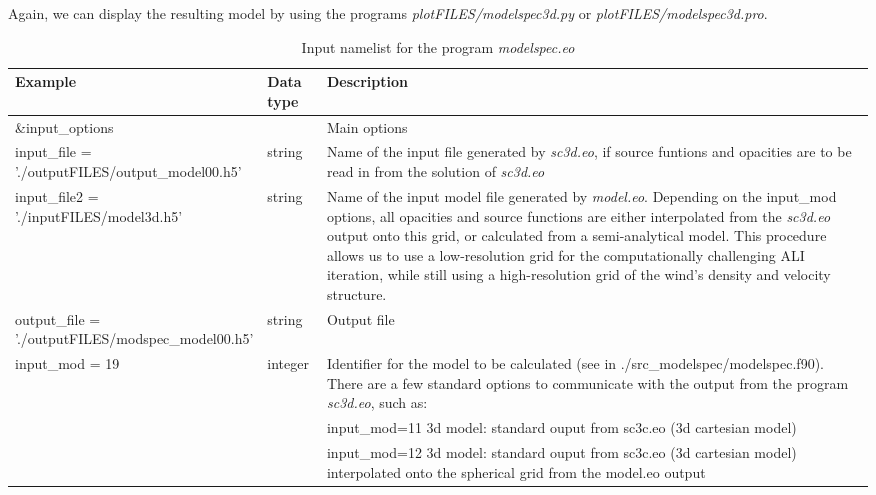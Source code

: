 \documentclass[10pt,a4paper]{article}
\makeatletter
\newcommand{\specialcell}[2][c]{%
  \begin{tabular}[#1]{@{}l@{}}#2\end{tabular}}
\makeatother
\begin{document}
%
Again, we can display the resulting model by using the programs
\textit{plotFILES/modelspec3d.py} or
\textit{plotFILES/modelspec3d.pro}.
%
%
\begin{footnotesize}
\begin{longtable}[h]{p{0.24\linewidth}p{0.07\linewidth}p{0.69\linewidth}}
\caption{\normalsize Input namelist for the program \textit{modelspec.eo}}
\label{tab:namelist_modelspec}
\\\hline\hline
 Example & Data type & Description \\\hline
\&input\_options & & Main options \\
\specialcell[t]{input\_file = \\'./outputFILES/output\_model00.h5'} &
 string & Name of the input file generated by \textit{sc3d.eo}, if source funtions and opacities are to be read in from the solution of \textit{sc3d.eo} \\
\specialcell[t]{input\_file2 = \\ './inputFILES/model3d.h5'} & string & Name of the input model file generated by \textit{model.eo}. Depending on the input\_mod options, all opacities and source  functions are either interpolated from the \textit{sc3d.eo} output onto this grid, or calculated from a semi-analytical model. This procedure allows us to use a low-resolution grid for the computationally challenging ALI iteration, while still using a high-resolution grid of the wind's density and velocity structure. \\
\specialcell[t]{output\_file = \\ './outputFILES/modspec\_model00.h5'} & string & Output file \\
input\_mod = 19 & integer & Identifier for the model to be calculated (see in ./src\_modelspec/modelspec.f90). There are a few standard options to communicate with the output from the program \textit{sc3d.eo}, such as:\\
& & input\_mod=11  3d model: standard ouput from sc3c.eo (3d cartesian model) \\
& & input\_mod=12  3d model: standard ouput from sc3c.eo (3d cartesian model) interpolated onto the spherical grid from the model.eo output \\


\end{longtable}
\end{footnotesize}
\end{document}

